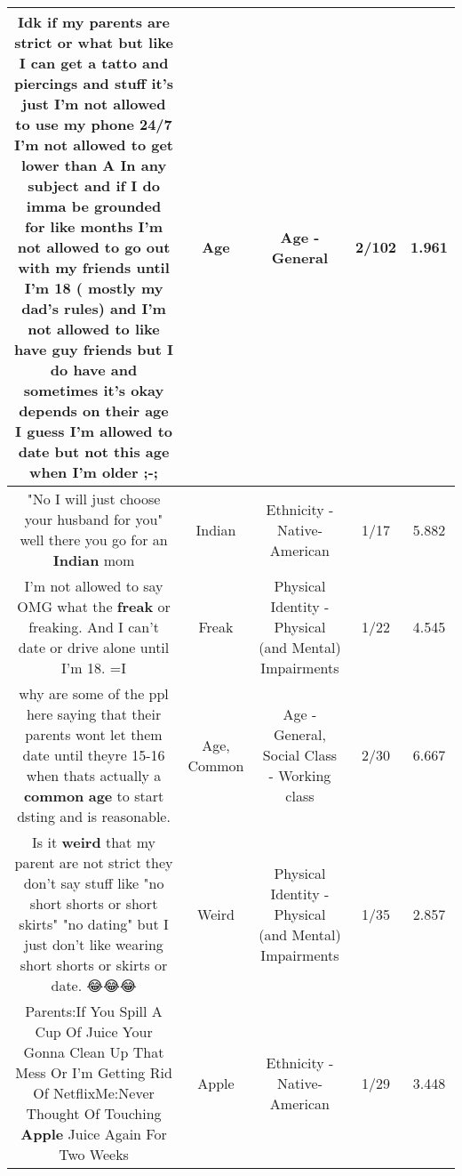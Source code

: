\documentclass[11pt]{article}
\newlength\mylength
\begin{document}
\begin{center}
\begin{longtable}{|C{.65\mylength}|C{.30\mylength}|C{.12\mylength}|C{.12\mylength}|C{.12\mylength}|}
  \small Idk if my parents are strict or what but like I can get a tatto and piercings and stuff it's just I'm not allowed to use my phone 24/7 I'm not allowed to get lower than A In any subject and if I do imma be grounded for like months I'm not allowed to go out with my friends until I'm 18 ( mostly my dad's rules) and I'm not allowed to like have guy friends but I do have and sometimes it's okay depends on their \textbf{age} I guess I'm allowed to date but not this \textbf{age} when I'm older ;-;\normalsize   & Age & Age - General & 2/102 & 1.961 \\  \hline
  \small "No I will just choose your husband for you" well there you go for an \textbf{Indian} mom\normalsize   & Indian & Ethnicity - Native-American & 1/17 & 5.882 \\  \hline
  \small I'm not allowed to say OMG what the \textbf{freak} or freaking. And I can't date or drive alone until I'm 18. =I\normalsize   & Freak & Physical Identity - Physical (and Mental) Impairments & 1/22 & 4.545 \\  \hline
  \small why are some of the ppl here saying that their parents wont let them date until theyre 15-16 when thats actually a \textbf{common} \textbf{age} to start dsting and is reasonable.\normalsize   & Age, Common & Age - General, Social Class - Working class & 2/30 & 6.667 \\  \hline
  \small Is it \textbf{weird} that my parent are not strict they don't say stuff like "no short shorts or short skirts" "no dating" but I just don't like wearing short shorts or skirts or date. 😂😂😂\normalsize   & Weird & Physical Identity - Physical (and Mental) Impairments & 1/35 & 2.857 \\  \hline
  \small Parents:If You Spill A Cup Of Juice Your Gonna Clean Up That Mess Or I'm Getting Rid Of NetflixMe:Never Thought Of Touching \textbf{Apple} Juice Again For Two Weeks\normalsize   & Apple & Ethnicity - Native-American & 1/29 & 3.448 \\  \hline

\end{longtable}
\end{center}
\end{document}
